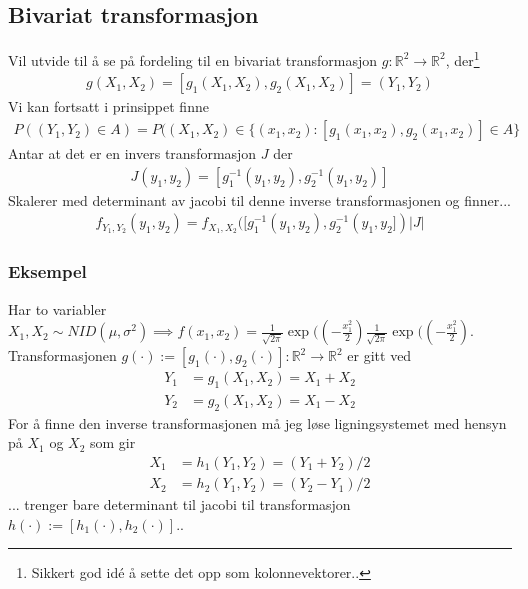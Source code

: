 \subsection{Bivariat transformasjon}
Vil utvide til å se på fordeling til en bivariat transformasjon $g:\mathbb{R}^2\to\mathbb{R}^2$, der\footnote{Sikkert god idé å sette det opp som kolonnevektorer..}
\begin{align}
g(X_1, X_2) = [g_1(X_1,X_2),g_2(X_1,X_2)] = (Y_1,Y_2)
\end{align}
Vi kan fortsatt i prinsippet finne
\begin{align}
P((Y_1,Y_2) \in A) = P((X_1,X_2) \in \{(x_1,x_2):[g_1(x_1,x_2),g_2(x_1,x_2)] \in  A\}
\end{align}
Antar at det er en invers transformasjon $J$ der 
\begin{align}
J(y_1,y_2) = [g_1^{-1}(y_1,y_2),g_2^{-1}(y_1,y_2)]
\end{align}
Skalerer med determinant av jacobi til denne inverse transformasjonen og finner...
\begin{align}
f_{Y_1,Y_2}(y_1,y_2)=f_{X_1,X_2}([g_1^{-1}(y_1,y_2),g_2^{-1}(y_1,y_2])|J|
\end{align}
\subsubsection{Eksempel}
Har to variabler $X_1, X_2 \sim NID(\mu, \sigma^2) \implies f(x_1,x_2) = \frac{1}{\sqrt{2\pi}}\exp(\left(-\frac{x_1^2}{2}\right)\frac{1}{\sqrt{2\pi}}\exp(\left(-\frac{x_1^2}{2}\right)$. Transformasjonen $g(\cdot) := [g_1(\cdot),g_2(\cdot)]:\mathbb{R}^2\to\mathbb{R}^2$ er gitt ved
\begin{align}
Y_1 &= g_1(X_1,X_2) = X_1 + X_2 \\
Y_2 &= g_2(X_1,X_2) = X_1 - X_2 
\end{align}
For å finne den inverse transformasjonen må jeg løse ligningsystemet med hensyn på $X_1$ og $X_2$ som gir
\begin{align}
X_1 &= h_1(Y_1,Y_2) = (Y_1+Y_2)/2 \\
X_2 &= h_2(Y_1,Y_2) = (Y_2-Y_1)/2 
\end{align}
... trenger bare determinant til jacobi til transformasjon $h(\cdot) := [h_1(\cdot),h_2(\cdot)]$..
